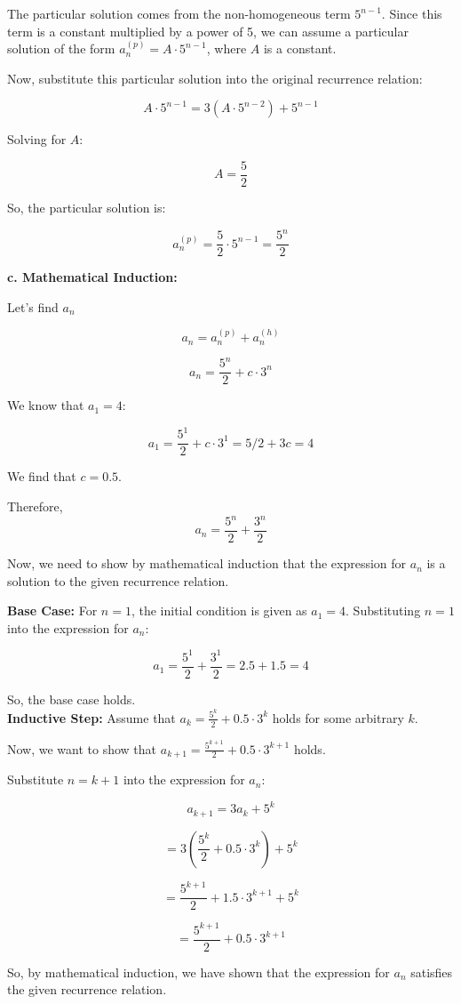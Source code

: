 \documentclass[12pt]{article}
\begin{document}
The particular solution comes from the non-homogeneous term \(5^{n-1}\). Since this term is a constant multiplied by a power of 5, we can assume a particular solution of the form \(a_n^{(p)} = A \cdot 5^{n-1}\), where \(A\) is a constant.

Now, substitute this particular solution into the original recurrence relation:

\[A \cdot 5^{n-1} = 3(A \cdot 5^{n-2}) + 5^{n-1}\]

Solving for \(A\):

\[A = \frac{5}{2}\]

So, the particular solution is:

\[a_n^{(p)} = \frac{5}{2} \cdot 5^{n-1} = \frac{5^n}{2}\]

\textbf{c. Mathematical Induction:}

Let's find \(a_n\)

\[a_n = a_n^{(p)} + a_n^{(h)} \]

\[a_n = \frac{5^n}{2} + c \cdot 3^n \]

We know that \(a_1 = 4\):

\[a_1 = \frac{5^1}{2} + c \cdot 3^1 = 5/2 + 3c = 4\]

We find that \(c=0.5\).

Therefore, \[a_n = \frac{5^n}{2} + \frac{3^n}{2} \]

Now, we need to show by mathematical induction that the expression for \(a_n\) is a solution to the given recurrence relation.

\textbf{Base Case:}
For \(n = 1\), the initial condition is given as \(a_1 = 4\). Substituting \(n = 1\) into the expression for \(a_n\):

\[a_1 = \frac{5^1}{2} + \frac{3^1}{2} = 2.5 + 1.5 = 4\]

So, the base case holds. \\

\textbf{Inductive Step:}
Assume that \(a_k = \frac{5^k}{2} + 0.5 \cdot 3^k\) holds for some arbitrary \(k\).

Now, we want to show that \(a_{k+1} = \frac{5^{k+1}}{2} + 0.5 \cdot 3^{k+1}\) holds.

Substitute \(n = k+1\) into the expression for \(a_n\):

\[a_{k+1} = 3a_k + 5^k\]

\[= 3\left(\frac{5^k}{2} + 0.5 \cdot 3^k\right) + 5^k\]

\[= \frac{5^{k+1}}{2} + 1.5 \cdot 3^{k+1} + 5^k\]

\[= \frac{5^{k+1}}{2} + 0.5 \cdot 3^{k+1}\]

So, by mathematical induction, we have shown that the expression for \(a_n\) satisfies the given recurrence relation.
\end{document}
